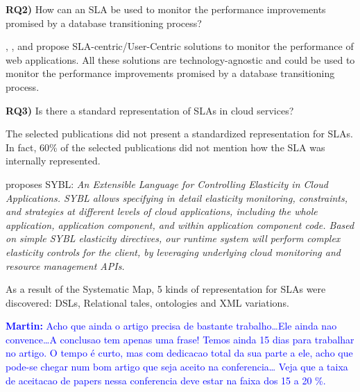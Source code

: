 \documentclass{article}
\newcommand{\imartin}[1]{\textcolor{blue}{\textbf{Martin: }#1}}
\begin{document}
\textbf{RQ2)} How can an SLA be used to monitor the performance improvements promised by a database transitioning process?

\cite{6253526}, \cite{6461875}, \cite{6511780} and \cite{Xiong:2011:APA:2038916.2038931} propose SLA-centric/User-Centric solutions to monitor the performance of web applications. All these solutions are technology-agnostic and could be used to monitor the performance improvements promised by a database transitioning process.

\textbf{RQ3)} Is there a standard representation of SLAs in cloud services? 

The selected publications did not present a standardized representation for SLAs. In fact, 60\% of the selected publications did not mention how the SLA was internally represented. 

\cite{6546068} proposes SYBL: \textit{An Extensible Language for Controlling Elasticity in Cloud Applications. SYBL allows specifying in detail elasticity monitoring, constraints, and strategies at different levels of cloud applications, including the whole application, application component, and within application component code. Based on simple SYBL elasticity directives, our runtime system will perform complex elasticity controls for the client, by leveraging underlying cloud monitoring and resource management APIs.}

As a result of the Systematic Map, 5 kinds of representation for SLAs were discovered: DSLs, Relational tales, ontologies and XML variations.

\imartin{Acho que ainda o artigo precisa de bastante trabalho\dots Ele ainda nao convence\dots A conclusao tem apenas uma frase!
Temos ainda 15 dias para trabalhar no artigo. O tempo é curto, mas com dedicacao total da sua parte a ele, acho que pode-se chegar num bom artigo que seja aceito na conferencia\dots
Veja que a taixa de aceitacao de papers nessa conferencia deve estar na faixa dos 15 a 20 \%.}


	
\end{document}
